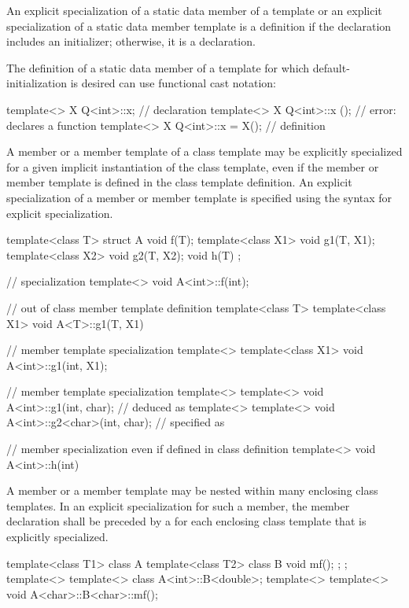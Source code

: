 \pnum
An explicit specialization of a static data member of a template
or an explicit specialization of a static data member template is a
definition if the declaration includes an initializer;
otherwise, it is a declaration.
\begin{note}
The definition of a static data member of a template
for which default-initialization is desired
can use functional cast notation:

\begin{codeblock}
template<> X Q<int>::x;                         // declaration
template<> X Q<int>::x ();                      // error: declares a function
template<> X Q<int>::x = X();                   // definition
\end{codeblock}
\end{note}

\pnum
A member or a member template of a class template may be explicitly specialized
for a given implicit instantiation of the class template, even if the member
or member template is defined in the class template definition.
An explicit specialization of a member or member template is specified using the
syntax for explicit specialization.
\begin{example}
\begin{codeblock}
template<class T> struct A {
  void f(T);
  template<class X1> void g1(T, X1);
  template<class X2> void g2(T, X2);
  void h(T) { }
};

// specialization
template<> void A<int>::f(int);

// out of class member template definition
template<class T> template<class X1> void A<T>::g1(T, X1) { }

// member template specialization
template<> template<class X1> void A<int>::g1(int, X1);

// member template specialization
template<> template<>
  void A<int>::g1(int, char);           //  deduced as 
template<> template<>
  void A<int>::g2<char>(int, char);     //  specified as 

// member specialization even if defined in class definition
template<> void A<int>::h(int) { }
\end{codeblock}
\end{example}

\pnum
A member or a member template may be nested within many enclosing class
templates.
In an explicit specialization for such a member,
the member declaration shall be preceded by a
for each enclosing class template that is explicitly specialized.
\begin{example}
\begin{codeblock}
template<class T1> class A {
  template<class T2> class B {
    void mf();
  };
};
template<> template<> class A<int>::B<double>;
template<> template<> void A<char>::B<char>::mf();
\end{codeblock}
\end{example}

